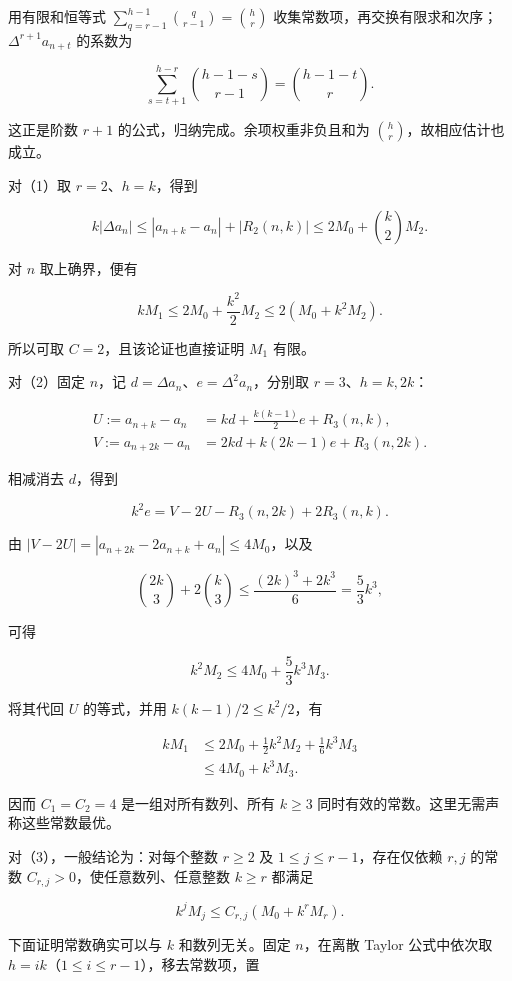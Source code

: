 \documentclass[11pt,a4paper]{article}
\begin{document}
用有限和恒等式 \(\sum_{q=r-1}^{h-1}\binom q{r-1}=\binom hr\)
收集常数项，再交换有限求和次序；\(\Delta^{r+1}a_{n+t}\) 的系数为

\[
\sum_{s=t+1}^{h-r}\binom{h-1-s}{r-1}
=\binom{h-1-t}{r}.
\]

这正是阶数 \(r+1\) 的公式，归纳完成。余项权重非负且和为
\(\binom hr\)，故相应估计也成立。

对（1）取 \(r=2\)、\(h=k\)，得到

\[
k|\Delta a_n|
\le|a_{n+k}-a_n|+|R_2(n,k)|
\le2M_0+\binom k2M_2.
\]

对 \(n\) 取上确界，便有

\[
kM_1\le2M_0+\frac{k^2}{2}M_2
\le2(M_0+k^2M_2).
\]

所以可取 \(C=2\)，且该论证也直接证明 \(M_1\) 有限。

对（2）固定 \(n\)，记 \(d=\Delta a_n\)、\(e=\Delta^2a_n\)，分别取
\(r=3\)、\(h=k,2k\)：

\[
\begin{aligned}
U:=a_{n+k}-a_n&=kd+\frac{k(k-1)}2e+R_3(n,k),\\
V:=a_{n+2k}-a_n&=2kd+k(2k-1)e+R_3(n,2k).
\end{aligned}
\]

相减消去 \(d\)，得到

\[
k^2e=V-2U-R_3(n,2k)+2R_3(n,k).
\]

由 \(|V-2U|=|a_{n+2k}-2a_{n+k}+a_n|\le4M_0\)，以及

\[
\binom{2k}{3}+2\binom k3
\le\frac{(2k)^3+2k^3}{6}=\frac53k^3,
\]

可得

\[
k^2M_2\le4M_0+\frac53k^3M_3.
\]

将其代回 \(U\) 的等式，并用 \(k(k-1)/2\le k^2/2\)，有

\[
\begin{aligned}
kM_1
&\le2M_0+\frac12k^2M_2+\frac16k^3M_3\\
&\le4M_0+k^3M_3.
\end{aligned}
\]

因而 \(C_1=C_2=4\) 是一组对所有数列、所有 \(k\ge3\)
同时有效的常数。这里无需声称这些常数最优。

对（3），一般结论为：对每个整数 \(r\ge2\) 及
\(1\le j\le r-1\)，存在仅依赖 \(r,j\) 的常数
\(C_{r,j}>0\)，使任意数列、任意整数 \(k\ge r\) 都满足

\[
k^jM_j\le C_{r,j}(M_0+k^rM_r).
\]

下面证明常数确实可以与 \(k\) 和数列无关。固定 \(n\)，在离散 Taylor
公式中依次取 \(h=ik\)（\(1\le i\le r-1\)），移去常数项，置
\end{document}
